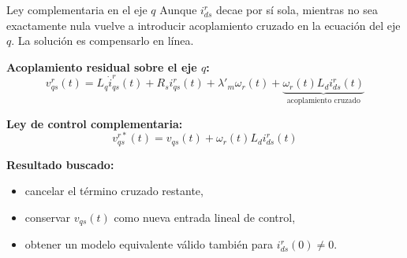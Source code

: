 \documentclass[aspectratio=169,t]{beamer}
\begin{document}
\begin{frame}{Ley complementaria en el eje $q$}
{\small\color{uncGray}Aunque $i_{ds}^{r}$ decae por sí sola, mientras no sea exactamente nula vuelve a introducir acoplamiento cruzado en la ecuación del eje $q$. La solución es compensarlo en línea.}\par
\vspace{3mm}

\textbf{Acoplamiento residual sobre el eje $q$:}
\begin{equation*}
v_{qs}^{r}(t)=L_q\dot{i}_{qs}^{r}(t)+R_s i_{qs}^{r}(t)+\lambda'_m\omega_r(t)+
\underbrace{\omega_r(t)L_d i_{ds}^{r}(t)}_{\text{acoplamiento cruzado}}
\end{equation*}

\textbf{Ley de control complementaria:}
\begin{equation*}
\boxed{\;v_{qs}^{r*}(t)=v_{qs}(t)+\omega_r(t)L_d i_{ds}^{r}(t)\;}
\end{equation*}

\textbf{Resultado buscado:}
\begin{itemize}
  \item cancelar el término cruzado restante,
  \item conservar $v_{qs}(t)$ como nueva entrada lineal de control,
  \item obtener un modelo equivalente válido también para $i_{ds}^{r}(0)\neq 0$.
\end{itemize}
\end{frame}
\end{document}
